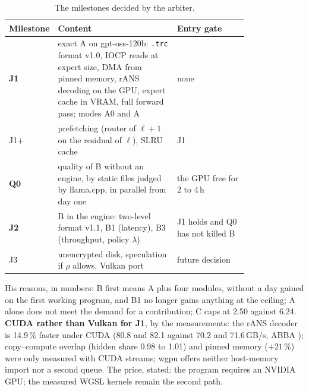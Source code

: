 \begin{table}[ht]
\centering\small
\caption[The milestones decided]{The milestones decided by the arbiter.}
\label{tab:jalons}
\begin{tabular}{@{}lp{0.5\linewidth}p{0.3\linewidth}@{}}
\toprule
Milestone & Content & Entry gate \\
\midrule
\textbf{J1} & exact A on gpt-oss-120b: \texttt{.trc} format v1.0, IOCP reads at expert size, DMA from pinned memory, rANS decoding on the GPU, expert cache in VRAM, full forward pass; modes A0 and A & none \\
J1+ & prefetching (router of $\ell+1$ on the residual of $\ell$), SLRU cache & J1 \\
\textbf{Q0} & quality of B without an engine, by static files judged by llama.cpp, in parallel from day one & the GPU free for 2 to 4\,h \\
\textbf{J2} & B in the engine: two-level format v1.1, B1 (latency), B3 (throughput, policy $\lambda$) & J1 holds and Q0 has not killed B \\
J3 & unencrypted disk, speculation if $\rho$ allows, Vulkan port & future decision \\
\bottomrule
\end{tabular}
\end{table}

His reasons, in numbers: B first means A plus four modules, without a day gained on the first working program, and B1 no longer gains anything at the ceiling; A alone does not meet the demand for a contribution; C caps at 2.50 against 6.24. \textbf{CUDA rather than Vulkan for J1}, by the measurements: the rANS decoder is 14.9\,\% faster under CUDA (80.8 and 82.1 against 70.2 and 71.6\,GB/s, ABBA \mes); copy--compute overlap (hidden share 0.98 to 1.01) and pinned memory ($+21\,\%$) were only measured with CUDA streams; wgpu offers neither host-memory import nor a second queue. The price, stated: the program requires an NVIDIA GPU; the measured WGSL kernels remain the second path.

